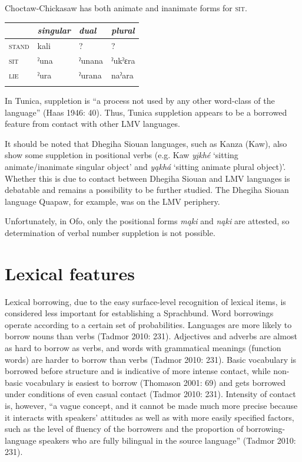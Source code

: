 \documentclass[output=paper]{LSP/langsci}
\begin{document}
Choctaw-Chickasaw has both animate and inanimate forms for \textsc{sit}.

\ea
{\hspace{1em}}\newline
\settowidth{}
\begin{tabular}{llll}
\hhline{====}& \emph{singular} & \emph{dual} & \emph{plural}
\\ \hline \textsc{stand} & kali\footnotemark & ? & ?
\\ \textsc{sit} & ˀuna & ˀunana & ˀukˀɛra 
\\ \textsc{lie} & ˀura & ˀurana & naˀara 
\\ \hhline{====}
\end{tabular} 
\z

In Tunica, suppletion is “a process not used by any other word-class of the language” (Haas 1946: 40). Thus, Tunica suppletion appears to be a borrowed feature from contact with other LMV languages.

	It should be noted that Dhegiha Siouan languages, such as Kanza (Kaw), also show some suppletion in positional verbs (e.g. Kaw \emph{yįkhé} `sitting animate/inanimate singular object' and \emph{yąkhá} `sitting animate plural object)'. Whether this is due to contact between Dhegiha Siouan and LMV languages is debatable and remains a possibility to be further studied. The Dhegiha Siouan language Quapaw, for example, was on the LMV periphery.

Unfortunately, in Ofo, only the positional forms \emph{mąki} and \emph{nąki} are attested, so determination of verbal number suppletion is not possible.

\section{Lexical features}

	Lexical borrowing, due to the easy surface-level recognition of lexical items, is considered less important for establishing a Sprachbund. Word borrowings operate according to a certain set of probabilities. Languages are more likely to borrow nouns than verbs (Tadmor 2010: 231). Adjectives and adverbs are almost as hard to borrow as verbs, and words with grammatical meanings (function words) are harder to borrow than verbs (Tadmor 2010: 231). Basic vocabulary is borrowed before structure and is indicative of more intense contact, while non-basic vocabulary is easiest to borrow (Thomason 2001: 69) and gets borrowed under conditions of even casual contact (Tadmor 2010: 231). Intensity of contact is, however, “a vague concept, and it cannot be made much more precise because it interacts with speakers’ attitudes as well as with more easily specified factors, such as the level of fluency of the borrowers and the proportion of borrowing-language speakers who are fully bilingual in the source language” (Tadmor 2010: 231). 
\end{document}
